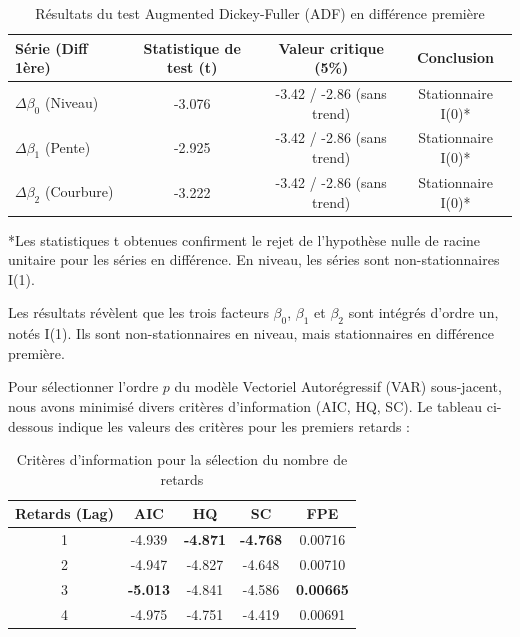 \documentclass[12pt,a4paper]{article}
\begin{document}
\begin{table}[H]
    \centering
    \caption{Résultats du test Augmented Dickey-Fuller (ADF) en différence première}
    \label{tab:adf}
    \begin{tabular}{lccc}
        \toprule
        \textbf{Série (Diff 1ère)} & \textbf{Statistique de test (t)} & \textbf{Valeur critique (5\%)} & \textbf{Conclusion} \\
        \midrule
        $\Delta \beta_0$ (Niveau)  & -3.076 & -3.42 / -2.86 (sans trend) & Stationnaire I(0)* \\
        $\Delta \beta_1$ (Pente)   & -2.925 & -3.42 / -2.86 (sans trend) & Stationnaire I(0)* \\
        $\Delta \beta_2$ (Courbure)& -3.222 & -3.42 / -2.86 (sans trend) & Stationnaire I(0)* \\
        \bottomrule
    \end{tabular}
    \vspace{0.2cm}
    \small{*Les statistiques t obtenues confirment le rejet de l'hypothèse nulle de racine unitaire pour les séries en différence. En niveau, les séries sont non-stationnaires I(1).}
\end{table}

Les résultats révèlent que les trois facteurs $\beta_0$, $\beta_1$ et $\beta_2$ sont intégrés d'ordre un, notés I(1). Ils sont non-stationnaires en niveau, mais stationnaires en différence première. 

Pour sélectionner l'ordre $p$ du modèle Vectoriel Autorégressif (VAR) sous-jacent, nous avons minimisé divers critères d'information (AIC, HQ, SC). Le tableau ci-dessous indique les valeurs des critères pour les premiers retards :

\begin{table}[H]
    \centering
    \caption{Critères d'information pour la sélection du nombre de retards}
    \label{tab:lags}
    \begin{tabular}{ccccc}
        \toprule
        \textbf{Retards (Lag)} & \textbf{AIC} & \textbf{HQ} & \textbf{SC} & \textbf{FPE} \\
        \midrule
        1 & -4.939 & \textbf{-4.871} & \textbf{-4.768} & 0.00716 \\
        2 & -4.947 & -4.827 & -4.648 & 0.00710 \\
        3 & \textbf{-5.013} & -4.841 & -4.586 & \textbf{0.00665} \\
        4 & -4.975 & -4.751 & -4.419 & 0.00691 \\
        \bottomrule
    \end{tabular}
\end{table}
\end{document}
